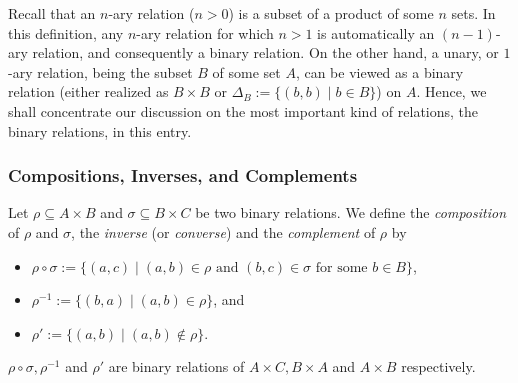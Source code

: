 \documentclass[12pt]{article}
\begin{document}

Recall that an $n$-ary relation ($n>0$) is a subset of a product of some $n$ sets.  In this definition, any $n$-ary relation for which $n>1$ is automatically an $(n-1)$-ary relation, and consequently a binary relation.  On the other hand, a unary, or $1$-ary relation, being the subset $B$ of some set $A$, can be viewed as a binary relation (either realized as $B\times B$ or $\Delta_B:=\lbrace (b,b)\mid b\in B\rbrace$) on $A$.  Hence, we shall concentrate our discussion on the most important kind of relations, the binary relations, in this entry.

\subsubsection*{Compositions, Inverses, and Complements}

Let $\rho \subseteq A\times B$ and $\sigma \subseteq B\times C$ be two binary relations.  We define the \emph{composition} of $\rho$ and $\sigma$, the \emph{inverse} (or \emph{converse}) and the \emph{complement} of $\rho$ by
\begin{itemize}
\item $\rho\circ\sigma := \lbrace (a,c)\mid (a,b)\in \rho \mbox{ and }(b,c)\in \sigma \mbox{ for some } b\in B\rbrace$, 
\item $\rho^{-1}:=\lbrace (b,a)\mid (a,b)\in \rho\rbrace$, and
\item $\rho':=\lbrace (a,b)\mid (a,b)\notin \rho\rbrace$.
\end{itemize}
$\rho\circ\sigma,\rho^{-1}$ and $\rho'$ are binary relations of $A\times C, B\times A$ and $A\times B$ respectively.
\end{document}
